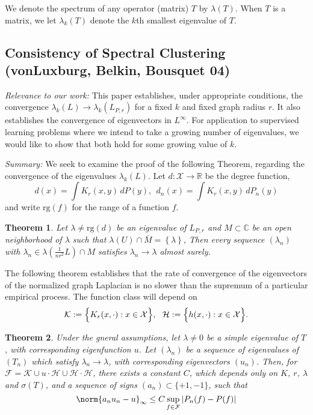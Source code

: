 \documentclass{article}
\newcommand{\Reals}{\mathbb{R}}
\newcommand{\abs}[1]{\left \lvert #1 \right \rvert}
\newcommand{\set}[1]{\left\{#1\right\}}
\newcommand{\1}{\mathbf{1}}
\newcommand{\Xset}{\mathcal{X}}
\newcommand{\rg}{\mathrm{rg}}
\theoremstyle{alden}
\theoremstyle{aldenthm}
\newtheorem{theorem}{Theorem}
\theoremstyle{definition}
\theoremstyle{remark}
\begin{document}
We denote the spectrum of any operator (matrix) $T$ by $\lambda(T)$. When $T$ is a matrix, we let $\lambda_k(T)$ denote the $k$th smallest eigenvalue of $T$.

\subsection{Consistency of Spectral Clustering (vonLuxburg, Belkin, Bousquet 04)}

\textit{Relevance to our work:} 
This paper establishes, under appropriate conditions, the convergence $\lambda_k(L) \to \lambda_k(L_{P,r})$ for a fixed $k$ and fixed graph radius $r$. It also establishes the convergence of eigenvectors in $L^{\infty}$. For application to supervised learning problems where we intend to take a growing number of eigenvalues, we would like to show that both hold for some growing value of $k$.

\textit{Summary:} We seek to examine the proof of the following Theorem, regarding the convergence of the eigenvalues $\lambda_k(L)$. Let $d: \Xset \to \Reals$ be the degree function,
\begin{equation*}
d(x) = \int K_r(x,y) \,dP(y),~~ d_n(x) = \int K_r(x,y) \,dP_n(y)
\end{equation*}
and write $\rg(f)$ for the range of a function $f$.


\begin{theorem}
	\label{thm:vonluxburg04_1}
	Let $\lambda \neq \rg(d)$ be an eigenvalue of $L_{P,r}$ and $M \subset \mathbb{C}$ be an open neighborhood of $\lambda$ such that $\lambda(U) \cap \bar{M} = \set{\lambda}$, Then every sequence $(\lambda_n)$ with $\lambda_n \in \lambda(\frac{1}{nr^2}L) \cap M$ satisfies $\lambda_n \to \lambda$ almost surely.
\end{theorem}

The following theorem establishes that the rate of convergence of the eigenvectors of the normalized graph Laplacian is no slower than the supremum of a particular empirical process. The function class will depend on
\begin{equation*}
\mathcal{K} := \Bigl\{ K_r(x,\cdot): x \in \Xset \Bigr\}, ~~ \mathcal{H} := \Bigl\{h(x,\cdot): x \in \Xset\Bigr\}.
\end{equation*}
\begin{theorem}
	\label{thm:vonluxburg04_2}
	Under the gneral assumptions, let $\lambda \neq 0$ be a simple eigenvalue of $T$, with corresponding eigenfunction $u$. Let $(\lambda_n)$ be a sequence of eigenvalues of $(T_n)$ which satisfy $\lambda_n \to \lambda$, with corresponding eigenvectors $(u_n)$. Then, for $\mathcal{F} = \mathcal{K} \cup u \cdot \mathcal{ H} \cup \mathcal{H} \cdot \mathcal{H}$, there exists a constant $C$, which depends only on $K$, $r$, $\lambda$ and $\sigma(T)$, and a sequence of signs $(a_n) \subset \{+1,-1\}$, such that
	\begin{equation*}
	\norm{a_nu_n - u}_{\infty} \leq C \sup_{f \in \mathcal{F}} \abs{P_n(f) - P(f)}
	\end{equation*}
\end{theorem}
\end{document}
